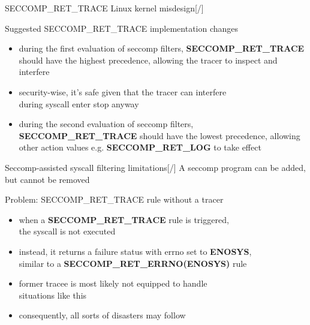 \documentclass[unicode,aspectratio=169,xcolor={table,dvipsnames,usenames}]{beamer}
\begin{document}
\begin{frame}{\Large SECCOMP\_RET\_TRACE Linux kernel misdesign\hfill [\insertframenumber/\inserttotalframenumber]}
\Large
\begin{block}{Suggested SECCOMP\_RET\_TRACE implementation changes}
\begin{itemize}
	\item during the first evaluation of seccomp filters,
		\textbf{SECCOMP\_RET\_TRACE} should have the highest
		precedence, allowing the tracer to inspect and interfere
	\item security-wise, it's safe given that the tracer can interfere \\
		during syscall enter stop anyway
	\item during the second evaluation of seccomp filters,
		\textbf{SECCOMP\_RET\_TRACE} should have the lowest
		precedence, allowing other action values e.g.
		\textbf{SECCOMP\_RET\_LOG} to take effect
\end{itemize}
\end{block}
\end{frame}

\begin{frame}{\Large Seccomp-assisted syscall filtering limitations\hfill [\insertframenumber/\inserttotalframenumber]}
\Large
A seccomp program can be added, but cannot be removed

\begin{block}{Problem: SECCOMP\_RET\_TRACE rule without a tracer}
\begin{itemize}
	\item when a \textbf{SECCOMP\_RET\_TRACE} rule is triggered, \\
		the syscall is not executed
	\item instead, it returns a failure status with errno set to \textbf{ENOSYS}, \\
		similar to a \textbf{SECCOMP\_RET\_ERRNO(ENOSYS)} rule
	\item former tracee is most likely not equipped to handle \\
		situations like this
	\item consequently, all sorts of disasters may follow
\end{itemize}
\end{block}
\end{frame}
\end{document}
